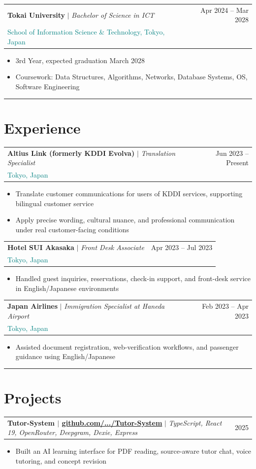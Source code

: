 \documentclass[9.5pt, a4paper]{article}
\makeatletter
\newcommand{\accentrule}{{\color{teal}\rule{\linewidth}{0.6pt}}}
\newcommand{\entry}[4]{%
  \vspace{1.5pt}
  \begin{tabularx}{\linewidth}{@{}Xr@{}}
    \textbf{\color{darkcharcoal}#1} \textcolor{midgray}{\small $|$ \textit{#2}} & \textcolor{midgray}{\small #4}\\
    \textcolor{teal}{\small #3} & \\
  \end{tabularx}
  \vspace{-1.5pt}
}
\newcommand{\projentry}[3]{%
  \vspace{1.5pt}
  \begin{tabularx}{\linewidth}{@{}Xr@{}}
    \textbf{\color{darkcharcoal}#1} \textcolor{midgray}{\small $|$ \textit{#2}} & \textcolor{midgray}{\small #3}\\
  \end{tabularx}
  \vspace{-1.5pt}
}
\newenvironment{cvbullets}{%
  \begin{itemize}[leftmargin=1.1em, itemsep=0.2pt, topsep=0.5pt, parsep=0pt]
  \small\color{darkcharcoal}
}{%
  \end{itemize}\vspace{1pt}
}
\makeatother
\begin{document}
\entry{Tokai University}{Bachelor of Science in ICT}{School of Information Science \& Technology, Tokyo, Japan}{Apr 2024 -- Mar 2028}
\begin{cvbullets}
  \item 3rd Year, expected graduation March 2028
  \item Coursework: Data Structures, Algorithms, Networks, Database Systems, OS, Software Engineering
\end{cvbullets}

\accentrule

\section{Experience}

\entry{Altius Link (formerly KDDI Evolva)}{Translation Specialist}{Tokyo, Japan}{Jun 2023 -- Present}
\begin{cvbullets}
  \item Translate customer communications for users of KDDI services, supporting bilingual customer service
  \item Apply precise wording, cultural nuance, and professional communication under real customer-facing conditions
\end{cvbullets}

\entry{Hotel SUI Akasaka}{Front Desk Associate}{Tokyo, Japan}{Apr 2023 -- Jul 2023}
\begin{cvbullets}
  \item Handled guest inquiries, reservations, check-in support, and front-desk service in English/Japanese environments
\end{cvbullets}

\entry{Japan Airlines}{Immigration Specialist at Haneda Airport}{Tokyo, Japan}{Feb 2023 -- Apr 2023}
\begin{cvbullets}
  \item Assisted document registration, web-verification workflows, and passenger guidance using English/Japanese
\end{cvbullets}

\accentrule

\section{Projects}

\projentry{Tutor-System $|$ \small\color{midgray}\href{https://github.com/MohamedFuad16/Tutor-System}{github.com/.../Tutor-System}}{TypeScript, React 19, OpenRouter, Deepgram, Dexie, Express}{2025}
\begin{cvbullets}
  \item Built an AI learning interface for PDF reading, source-aware tutor chat, voice tutoring, and concept revision
\end{cvbullets}
\end{document}
